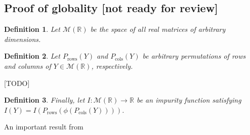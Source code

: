 \documentclass[sn-mathphys-num]{sn-jnl}%
\theoremstyle{thmstyleone}%
\theoremstyle{thmstyletwo}%
\theoremstyle{thmstylethree}%
\newtheorem{definition}{Definition}%
\begin{document}
\begin{appendices}





\section{Proof of globality [not ready for review]}
\label{sec:proof globality}


\begin{definition}
    Let $\mathcal{M}(\mathbb{R})$ be the space of all real matrices of arbitrary dimensions.
\end{definition}

\begin{definition}
    Let $P_\text{rows}(Y)$ and $P_\text{cols}(Y)$ be arbitrary permutations of rows and columns of
    $Y\in \mathcal{M}(\mathbb{R})$, respectively.
\end{definition}
%
[TODO]

\begin{definition}
    Finally, let $I\colon \mathcal{M}(\mathbb{R})\to \mathbb{R}$
    be an impurity function satisfying $I(Y) = I(P_\text{rows}(\phi(P_\text{cols}(Y))))$.
\end{definition}
%

An important result from \cite{zaheer_deep_2017}


\end{appendices}
\end{document}
